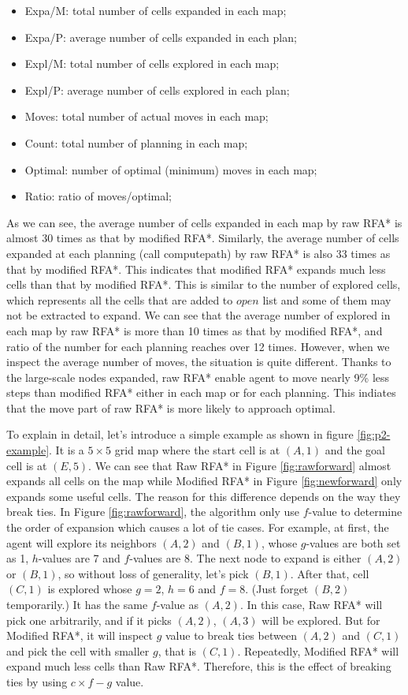 \begin{itemize}
\item Expa/M: total number of cells expanded in each map;
\item Expa/P: average number of cells expanded in each plan;
\item Expl/M: total number of cells explored in each map;
\item Expl/P: average number of cells explored in each plan;
\item Moves: total number of actual moves in each map;
\item Count: total number of planning in each map;
\item Optimal: number of optimal (minimum) moves in each map;
\item Ratio: ratio of moves/optimal;
\end{itemize}

As we can see, the average number of cells expanded in each map by raw RFA* is
almost 30 times as that by modified RFA*. Similarly, the average number of
cells expanded at each planning (call computepath) by raw RFA* is also 33 times
as that by modified RFA*. This indicates that modified RFA* expands much less
cells than that by modified RFA*. This is similar to the number of explored
cells, which represents all the cells that are added to $open$ list and some of
them may not be extracted to expand. We can see that the average number of
explored in each map by raw RFA* is more than 10 times as that by modified
RFA*, and ratio of the number for each planning reaches over 12 times. However,
when we inspect the average number of moves, the situation is quite different.
Thanks to the large-scale nodes expanded, raw RFA* enable agent to move nearly
9\% less steps than modified RFA* either in each map or for each planning. This
indiates that the move part of raw RFA* is more likely to approach optimal.

To explain in detail, let's introduce a simple example as shown in figure
\ref{fig:p2-example}. It is a $5\times 5$ grid map where the start cell is at
$(A,1)$ and the goal cell is at $(E,5)$.  We can see that Raw RFA* in Figure
\ref{fig:rawforward} almost expands all cells on the map while Modified RFA* in
Figure \ref{fig:newforward} only expands some useful cells. The reason for this
difference depends on the way they break ties. In Figure \ref{fig:rawforward},
the algorithm only use $f$-value to determine the order of expansion which
causes a lot of tie cases. For example, at first, the agent will explore its
neighbors $(A,2)$ and $(B,1)$, whose $g$-values are both set as 1, $h$-values
are 7 and $f$-values are 8. The next node to expand is either $(A,2)$ or
$(B,1)$, so without loss of generality, let's pick $(B,1)$. After that, cell
$(C,1)$ is explored whose $g=2$, $h=6$ and $f=8$. (Just forget $(B,2)$
temporarily.) It has the same $f$-value as $(A,2)$.  In this case, Raw RFA*
will pick one arbitrarily, and if it picks $(A,2)$, $(A,3)$ will be explored.
But for Modified RFA*, it will inspect $g$ value to break ties between $(A,2)$
and $(C,1)$ and pick the cell with smaller $g$, that is $(C,1)$. Repeatedly,
Modified RFA* will expand much less cells than Raw RFA*. Therefore, this is the
effect of breaking ties by using $c\times f-g$ value.


